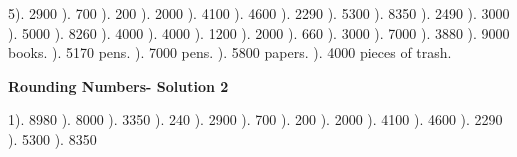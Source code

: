 \documentclass{article}%
\begin{document}
5). 2900%
). 700%
). 200%
). 2000%
). 4100%
). 4600%
). 2290%
). 5300%
). 8350%
). 2490%
). 3000%
). 5000%
). 8260%
). 4000%
). 4000%
). 1200%
). 2000%
). 660%
). 3000%
). 7000%
). 3880%
). 9000 books.%
). 5170 pens.%
). 7000 pens.%
). 5800 papers.%
). 4000 pieces of trash.%
\newline%
\newpage%
\large%
\begin{center}%
\textbf{Rounding Numbers- Solution 2}%
\newline%
\end{center} \normalsize%
1). 8980%
). 8000%
). 3350%
). 240%
). 2900%
). 700%
). 200%
). 2000%
). 4100%
). 4600%
). 2290%
). 5300%
). 8350%
\newline%
\end{document}
